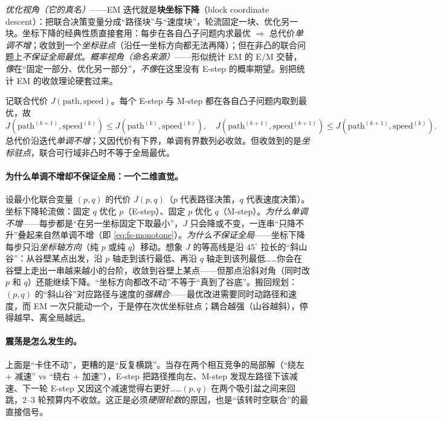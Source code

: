 \emph{优化视角（它的真名）}——EM 迭代就是\textbf{块坐标下降}（block coordinate descent）：把联合决策变量分成“路径块”与“速度块”，轮流固定一块、优化另一块。坐标下降的经典性质直接套用：每步在各自凸子问题内求最优 $\Rightarrow$ 总代价\emph{单调不增}；收敛到一个\emph{坐标驻点}（沿任一坐标方向都无法再降）；但在非凸的联合问题上\emph{不保证全局最优}。\emph{概率视角（命名来源）}——形似统计 EM 的 E/M 交替，\emph{像}在“固定一部分、优化另一部分”，\emph{不像}在这里没有 E-step 的概率期望。别把统计 EM 的收敛理论硬套过来。

\begin{theorem}[块坐标下降的单调不增]\label{thm:fs-bcd}
记联合代价 $J(\mathrm{path},\mathrm{speed})$。每个 E-step 与 M-step 都在各自凸子问题内取到最优，故
\begin{equation}
  J(\mathrm{path}^{(k+1)},\mathrm{speed}^{(k)})\le J(\mathrm{path}^{(k)},\mathrm{speed}^{(k)}),\quad
  J(\mathrm{path}^{(k+1)},\mathrm{speed}^{(k+1)})\le J(\mathrm{path}^{(k+1)},\mathrm{speed}^{(k)}).
  \label{eq:fs-monotone}
\end{equation}
总代价沿迭代\emph{单调不增}；又因代价有下界，单调有界数列必收敛。但收敛到的是\emph{坐标驻点}，联合可行域非凸时不等于全局最优。
\end{theorem}

\paragraph{为什么单调不增却不保证全局：一个二维直觉。}
设最小化联合变量 $(p,q)$ 的代价 $J(p,q)$（$p$ 代表路径决策，$q$ 代表速度决策）。坐标下降轮流做：固定 $q$ 优化 $p$（E-step）、固定 $p$ 优化 $q$（M-step）。\emph{为什么单调不增}——每步都是“在另一坐标固定下取最小”，$J$ 只会降或不变，一连串“只降不升”叠起来自然单调不增（即 \cref{eq:fs-monotone}）。\emph{为什么不保证全局}——坐标下降每步只沿\emph{坐标轴方向}（纯 $p$ 或纯 $q$）移动。想象 $J$ 的等高线是沿 $45^\circ$ 拉长的“斜山谷”：从谷壁某点出发，沿 $p$ 轴走到该行最低、再沿 $q$ 轴走到该列最低……你会在谷壁上走出一串越来越小的台阶，收敛到谷壁上某点——但那点沿斜对角（同时改 $p$ 和 $q$）还能继续下降。“坐标方向都改不动”不等于“真到了谷底”。搬回规划：$(p,q)$ 的“斜山谷”对应路径与速度的\emph{强耦合}——最优改进需要同时动路径和速度，而 EM 一次只能动一个，于是停在次优坐标驻点；耦合越强（山谷越斜），停得越早、离全局越远。

\paragraph{震荡是怎么发生的。}
上面是“卡住不动”，更糟的是“反复横跳”。当存在两个相互竞争的局部解（“绕左 + 减速” vs “绕右 + 加速”），E-step 把路径推向左、M-step 发现左路径下该减速、下一轮 E-step 又因这个减速觉得右更好……$(p,q)$ 在两个吸引盆之间来回跳，$2$--$3$ 轮预算内不收敛。这正是必须\emph{硬限轮数}的原因，也是“该转时空联合”的最直接信号。

